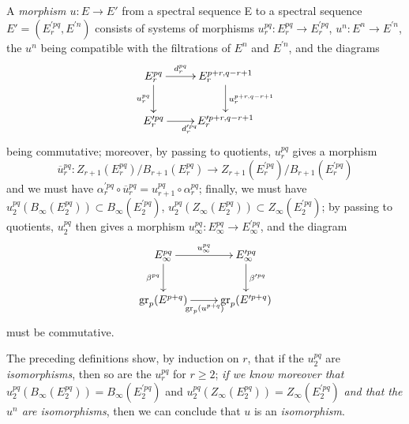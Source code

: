 \begin{env}[11.1.2]
\label{0.11.1.2}
A \emph{morphism $u:E\to E'$} from a spectral sequence E to a spectral
sequence $E'=(E_r^{\prime pq},E^{\prime n})$ consists of systems of
morphisms $u_r^{pq}:E_r^{pq}\to E_r^{\prime pq}$,
$u^n:E^n\to E^{\prime n}$, the $u^n$ being compatible with the filtrations
of $E^n$ and $E^{\prime n}$, and the diagrams
\[
  \xymatrix{
    E_r^{pq}\ar[r]^-{d_r^{pq}}\ar[d]_{u_r^{pq}} &
    E_r^{p+r,q-r+1}\ar[d]^{u_r^{p+r,q-r+1}}\\
    E_r^{\prime pq}\ar[r]_{d_r^{\prime pq}} &
    E_r^{\prime p+r,q-r+1}
  }
\]
being commutative; moreover, by passing to quotients, $u_r^{pq}$ gives a
morphism
\[
  \overline u_r^{pq}:
  Z_{r+1}(E_r^{pq})/B_{r+1}(E_r^{pq})\longrightarrow
  Z_{r+1}(E_r^{\prime pq})/B_{r+1}(E_r^{\prime pq})
\]
and we must have
$\alpha_r^{\prime pq}\circ\overline u_r^{pq}
=u_{r+1}^{pq}\circ\alpha_r^{pq}$; finally, we must have
$u_2^{pq}(B_\infty(E_2^{pq}))\subset B_\infty(E_2^{\prime pq})$,
$u_2^{pq}(Z_\infty(E_2^{pq}))\subset Z_\infty(E_2^{\prime pq})$; by
passing to quotients, $u_2^{pq}$ then gives a morphism
$u_\infty^{pq}:E_\infty^{pq}\to E_\infty^{\prime pq}$, and the diagram
\[
  \xymatrix{
    E_\infty^{pq}\ar[r]^-{u_\infty^{pq}}\ar[d]_{\beta^{pq}} &
    E_\infty^{\prime pq}\ar[d]^{\beta^{\prime pq}}\\
    \operatorname{gr}_p(E^{p+q})
      \ar[r]_{\operatorname{gr}_p(u^{p+q})} &
    \operatorname{gr}_p(E^{\prime p+q})
  }
\]
must be commutative.

The preceding definitions show, by induction on $r$, that if the
$u_2^{pq}$ are \emph{isomorphisms}, then so are the $u_r^{pq}$
for $r\geq2$; \emph{if we know moreover that}
$u_2^{pq}(B_\infty(E_2^{pq}))=B_\infty(E_2^{\prime pq})$ and
$u_2^{pq}(Z_\infty(E_2^{pq}))=Z_\infty(E_2^{\prime pq})$ \emph{and that the
$u^n$ are isomorphisms}, then we can conclude that $u$ is an
\emph{isomorphism}.
\end{env}

